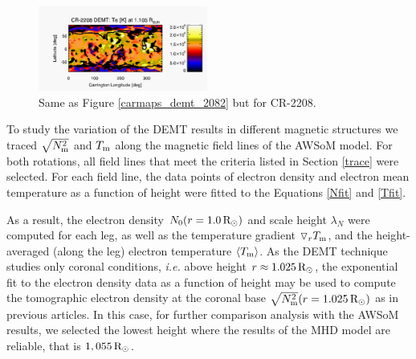 \documentclass[namedreferences]{solarphysics}
\newcommand{\mrsun}{{\rm R_\odot}}
\newcommand{\lN}{\lambda_N}
\newcommand{\dr}{\triangledown_r}
\newcommand{\Tm}{T_{\rm m}}
\newcommand{\aTm}{\left<\Tm\right>}
\newcommand{\Nsqm}{N^2_{{\rm m}}}
\newcommand{\sqravgN}{\sqrt{\Nsqm}}
\begin{document}
\begin{article}
\begin{figure}[h!]
\begin{center}
\includegraphics[width=0.495\textwidth]{figs/map_Tm_CR2208_DEMT-AIA_H1_L522_r3d_1105_Rsun.pdf}
\caption{Same as Figure \ref{carmaps_demt_2082} but for CR-2208.}
\label{carmaps_demt_2208}
\end{center}
\end{figure}

{To study the variation of the DEMT results in different magnetic structures we traced $\sqravgN$ and $\Tm$ along the magnetic field lines of the AWSoM model.} For both rotations, all field lines that meet the criteria listed in Section \ref{trace} were selected. For each field line, the data points of electron density and electron mean temperature as a function of height were fitted to the Equations \ref{Nfit} and \ref{Tfit}.



As a result, the electron density $N_0(r=1.0\,\mrsun)$ and scale height $\lN$ were computed for each leg, as well as the temperature gradient $\dr \Tm$, and the height-averaged (along the leg) {electron temperature} $\aTm$. As the DEMT technique studies only coronal conditions, \textit{i.e.} above height $r\approx 1.025\,\mrsun$, the exponential fit to the electron density data as a function of height may be used to compute the tomographic electron density at the coronal base $\sqravgN(r=1.025\,\mrsun)$ as in previous articles. In this case, for further comparison analysis with the AWSoM results, we selected the lowest height where the results of the MHD model are reliable, that is $1,055\,\mrsun$.




\end{article}
\end{document}
